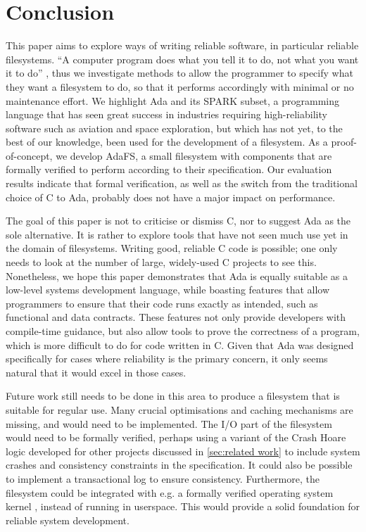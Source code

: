 \section{Conclusion}
This paper aims to explore ways of writing reliable software, in particular reliable filesystems.
``A computer program does what you tell it to do, not what you want it to do'' \cite{bloch1997}, thus we investigate methods to allow the programmer to specify what they want a filesystem to do, so that it performs accordingly with minimal or no maintenance effort.
We highlight Ada and its SPARK subset, a programming language that has seen great success in industries requiring high-reliability software such as aviation and space exploration, but which has not yet, to the best of our knowledge, been used for the development of a filesystem.
As a proof-of-concept, we develop AdaFS, a small filesystem with components that are formally verified to perform according to their specification.
Our evaluation results indicate that formal verification, as well as the switch from the traditional choice of C to Ada, probably does not have a major impact on performance.

The goal of this paper is not to criticise or dismiss C, nor to suggest Ada as the sole alternative.
It is rather to explore tools that have not seen much use yet in the domain of filesystems.
Writing good, reliable C code is possible; one only needs to look at the number of large, widely-used C projects to see this.
Nonetheless, we hope this paper demonstrates that Ada is equally suitable as a low-level systems development language, while boasting features that allow programmers to ensure that their code runs exactly as intended, such as functional and data contracts.
These features not only provide developers with compile-time guidance, but also allow tools to prove the correctness of a program, which is more difficult to do for code written in C.
Given that Ada was designed specifically for cases where reliability is the primary concern, it only seems natural that it would excel in those cases.

Future work still needs to be done in this area to produce a filesystem that is suitable for regular use.
Many crucial optimisations and caching mechanisms are missing, and would need to be implemented.
The I/O part of the filesystem would need to be formally verified, perhaps using a variant of the Crash Hoare logic developed for other projects discussed in \autoref{sec:related work} to include system crashes and consistency constraints in the specification.
It could also be possible to implement a transactional log to ensure consistency.
Furthermore, the filesystem could be integrated with e.g. a formally verified operating system kernel \cite{king2019}, instead of running in userspace.
This would provide a solid foundation for reliable system development.
